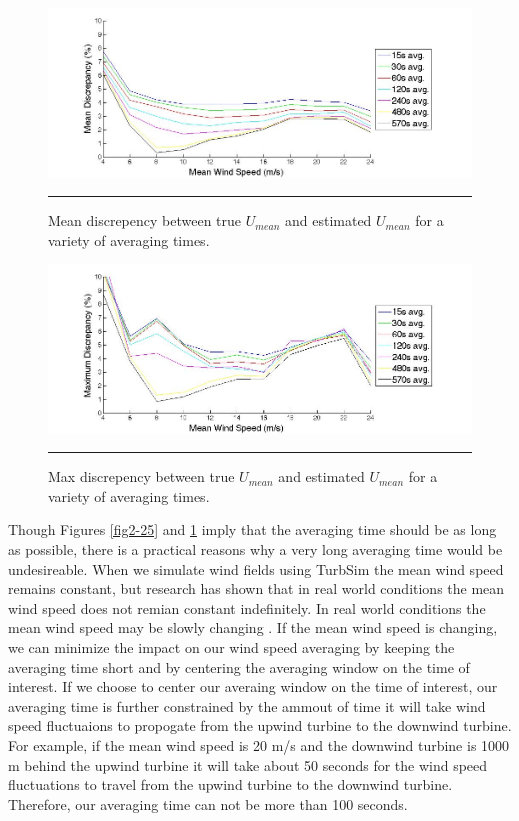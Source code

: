 \begin{figure}[htbp]
	\centering
		\includegraphics[trim = {3cm 0 2.5cm 0}, clip, width = \linewidth]{Figures/ch2Figures/fig2-26.jpg}
		\rule{35em}{0.5pt}
	\caption{Mean discrepency between true $U_{mean}$ and estimated $U_{mean}$ for a variety of averaging times.}
	\label{fig2-26}
\end{figure}

\begin{figure}[htbp]
	\centering
		\includegraphics[trim = {3cm 0 2.5cm 0}, clip, width = \linewidth]{Figures/ch2Figures/fig2-27.jpg}
		\rule{35em}{0.5pt}
	\caption{Max discrepency between true $U_{mean}$ and estimated $U_{mean}$ for a variety of averaging times.}
	\label{fig2-27}
\end{figure}

Though Figures  \ref{fig2-25} and \ref{fig2-26} imply that the averaging time should be as long as possible, there is a practical reasons why a very long averaging time would be undesireable. When we simulate wind fields using TurbSim the mean wind speed remains constant, but research has shown that in real world conditions the mean wind speed does not remian constant indefinitely. In real world conditions the mean wind speed may be slowly changing \cite{vanderhoven1957}. If the mean wind speed is changing, we can minimize the impact on our wind speed averaging by keeping the averaging time short and by centering the averaging window on the time of interest. If we choose to center our averaing window on the time of interest, our averaging time is further constrained by the ammout of time it will take wind speed fluctuaions to propogate from the upwind turbine to the downwind turbine. For example, if the mean wind speed is 20 m/s and the downwind turbine is 1000 m behind the upwind turbine it will take about 50 seconds for the wind speed fluctuations to travel from the upwind turbine to the downwind turbine. Therefore, our averaging time can not be more than 100 seconds.

